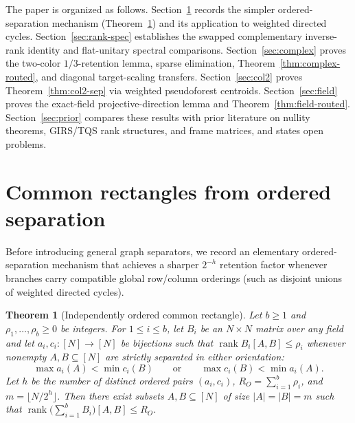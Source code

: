 \documentclass[11pt,reqno]{amsart}
\numberwithin{equation}{section}
\newtheorem{theorem}{Theorem}[section]
\theoremstyle{definition}
\theoremstyle{remark}
\newcommand{\rank}{\operatorname{rank}}
\begin{document}
The paper is organized as follows. Section~\ref{sec:ordered} records the simpler ordered-separation mechanism (Theorem~\ref{thm:ordered}) and its application to weighted directed cycles. Section~\ref{sec:rank-spec} establishes the swapped complementary inverse-rank identity and flat-unitary spectral comparisons. Section~\ref{sec:complex} proves the two-color $1/3$-retention lemma, sparse elimination, Theorem~\ref{thm:complex-routed}, and diagonal target-scaling transfers. Section~\ref{sec:col2} proves Theorem~\ref{thm:col2-sep} via weighted pseudoforest centroids. Section~\ref{sec:field} proves the exact-field projective-direction lemma and Theorem~\ref{thm:field-routed}. Section~\ref{sec:prior} compares these results with prior literature on nullity theorems, GIRS/TQS rank structures, and frame matrices, and states open problems.

\section{Common rectangles from ordered separation}
\label{sec:ordered}

Before introducing general graph separators, we record an elementary ordered-separation mechanism that achieves a sharper $2^{-h}$ retention factor whenever branches carry compatible global row/column orderings (such as disjoint unions of weighted directed cycles).

\begin{theorem}[Independently ordered common rectangle]
\label{thm:ordered}
Let $b\ge 1$ and $\rho_1,\ldots,\rho_b\ge 0$ be integers. For $1\le i\le b$, let $B_i$ be an $N\times N$ matrix over any field and let $a_i,c_i:[N]\to[N]$ be bijections such that $\rank B_i[A,B]\le\rho_i$ whenever nonempty $A,B\subseteq[N]$ are strictly separated in either orientation:
\[
\max a_i(A) < \min c_i(B)\qquad\text{or}\qquad \max c_i(B) < \min a_i(A).
\]
Let $h$ be the number of distinct ordered pairs $(a_i,c_i)$, $R_O = \sum_{i=1}^b \rho_i$, and $m = \lfloor N/2^h\rfloor$. Then there exist subsets $A,B\subseteq[N]$ of size $|A|=|B|=m$ such that $\rank\bigl(\sum_{i=1}^b B_i\bigr)[A,B]\le R_O$.
\end{theorem}
\end{document}
